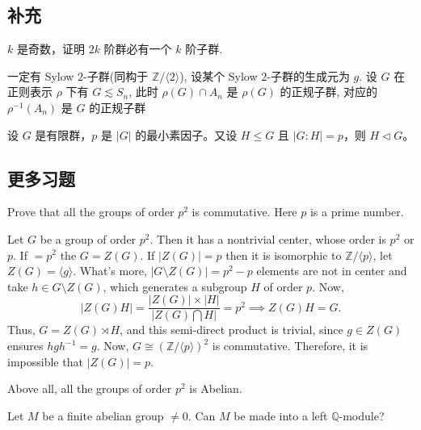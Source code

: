 
\subsection{补充}

\setcounter{pb}{1}
\begin{problem}
    $k$ 是奇数，证明 $2k$ 阶群必有一个 $k$ 阶子群.
\end{problem}

\begin{vain}
    一定有 Sylow $2$-子群(同构于 $\mathbb{Z}/\langle 2 \rangle$), 设某个 Sylow $2$-子群的生成元为 $g$. 
    设 $G$ 在正则表示 $\rho$ 下有 $G \lesssim S_{n}$, 
    此时 $\rho(G)\cap A_{n}$ 是 $\rho(G)$ 的正规子群, 
    对应的 $\rho^{-1}(A_{n})$ 是 $G$ 的正规子群
\end{vain}

\setcounter{pb}{3}
\begin{problem}
    设 $G $ 是有限群，$p $ 是 $|G| $ 的最小素因子。又设 $H \leq G $ 且 $|G:H| = p $，则 $H \vartriangleleft G $。
\end{problem}

\subsection{更多习题}

\setcounter{pb}{5}

\begin{problem}
    Prove that all the groups of order $p^{2}$ is commutative. Here $p$ is a prime number.
\end{problem}

\begin{solution}
    Let $G$ be a group of order $p^{2}$. Then it has a nontrivial center, whose order is $p^{2}$ or $p$. 
    If $=p^{2}$ the $G=Z(G)$. 
    If $|Z(G)|=p$ then it is isomorphic to $\mathbb{Z}/\langle p \rangle $, let $Z(G)=\langle g \rangle$. 
    What's more, $|G\setminus Z(G)|=p^{2}-p$ elements are not in center and take $h\in G\setminus Z(G)$, which generates a subgroup $H$ of order $p$. 
    Now, 
        \[
            |Z(G) H|=\frac{|Z(G)|\times|H|}{|Z(G)\bigcap H|}=p^{2}\implies Z(G)H=G.
        \]
    Thus, $G=Z(G)\rtimes H$, and this semi-direct product is trivial, since $g\in Z(G)$ ensures $h g h^{-1}=g$. 
    Now, $G\cong (\mathbb{Z}/\langle p \rangle)^{2} $ is commutative. Therefore, it is impossible that $|Z(G)|=p$.
    \par Above all, all the groups of order $p^{2}$ is Abelian.
\end{solution}
\setcounter{pb}{8}
\begin{problem}
    Let $M $ be a finite abelian group $\neq 0$. Can $M $ be made into a left $\mathbb{Q}$-module?
\end{problem}

